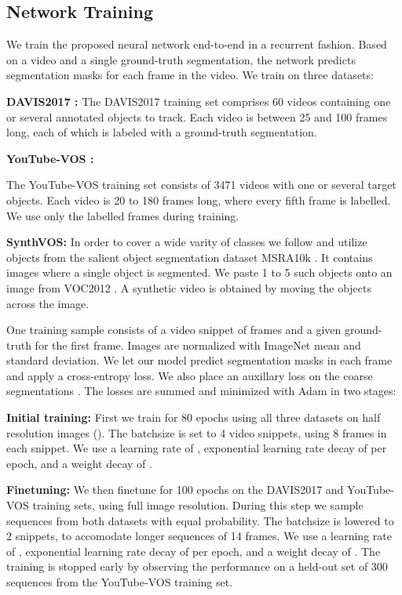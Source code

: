 \documentclass[10pt,twocolumn,letterpaper]{article}
\newcommand{\parsection}[1]{\noindent\textbf{#1:} }
\begin{document}
\subsection{Network Training}
We train the proposed neural network end-to-end in a recurrent fashion. Based on a video and a single ground-truth segmentation, the network predicts segmentation masks for each frame in the video. We train on three datasets:



\parsection{DAVIS2017 \cite{DAVIS17}}
The DAVIS2017 training set comprises 60 videos containing one or several annotated objects to track. Each video is between 25 and 100 frames long, each of which is labeled with a ground-truth segmentation.

\parsection{YouTube-VOS \cite{YTVOS}}

The YouTube-VOS training set consists of 3471 videos with one or several target objects. Each video is 20 to 180 frames long, where every fifth frame is labelled. We use only the labelled frames during training.

\parsection{SynthVOS}
In order to cover a wide varity of classes we follow \cite{MSK,RGMP} and utilize objects from the salient object segmentation dataset MSRA10k \cite{cheng2015msra10k}. It contains  images where a single object is segmented. We paste 1 to 5 such objects onto an image from VOC2012 \cite{everingham2015pascal}. A synthetic video is obtained by moving the objects across the image.

One training sample consists of a video snippet of  frames and a given ground-truth for the first frame. Images are normalized with ImageNet \cite{ILSVRC15} mean and standard deviation. We let our model predict segmentation masks in each frame and apply a cross-entropy loss. We also place an auxillary loss on the coarse segmentations . The losses are summed and minimized with Adam in two stages:

\parsection{Initial training}
First we train for 80 epochs using all three datasets on half resolution images (). The batchsize is set to 4 video snippets, using 8 frames in each snippet. We use a learning rate of , exponential learning rate decay of  per epoch, and a weight decay of .

\parsection{Finetuning}
We then finetune for 100 epochs on the DAVIS2017 and YouTube-VOS training sets, using full image resolution. During this step we sample sequences from both datasets with equal probability. The batchsize is lowered to 2 snippets, to accomodate longer sequences of 14 frames. We use a learning rate of , exponential learning rate decay of  per epoch, and a weight decay of . The training is stopped early by observing the performance on a held-out set of 300 sequences from the YouTube-VOS training set.
\end{document}
